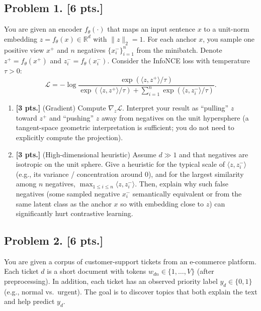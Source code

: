 \documentclass[11pt,a4paper]{article}
\begin{document}
\subsection{Problem 1. [6 pts.]}
You are given an encoder $f_{\theta}(\cdot)$ that maps an input sentence $x$ to a unit-norm embedding $z = f_{\theta}(x) \in \mathbb{R}^{d}$ with $\|z\|_{2} = 1$. For each anchor $x$, you sample one positive view $x^{+}$ and $n$ negatives $\{x_{i}^{-}\}_{i=1}^{n}$ from the minibatch. Denote $z^{+} = f_{\theta}(x^{+})$ and $z_{i}^{-} = f_{\theta}(x_{i}^{-})$. Consider the InfoNCE loss with temperature $\tau > 0$:
\[
\mathcal{L} = -\log \frac{\exp(\langle z, z^{+} \rangle / \tau)}{\exp(\langle z, z^{+} \rangle / \tau) + \sum_{i=1}^{n} \exp(\langle z, z_{i}^{-} \rangle / \tau)}.
\]
\begin{enumerate}[label=(\alph*)]
    \item \textbf{[3 pts.]} (Gradient) Compute $\nabla_z \mathcal{L}$. Interpret your result as ``pulling'' $z$ toward $z^{+}$ and ``pushing'' $z$ away from negatives on the unit hypersphere (a tangent-space geometric interpretation is sufficient; you do not need to explicitly compute the projection).
    \item \textbf{[3 pts.]} (High-dimensional heuristic) Assume $d \gg 1$ and that negatives are isotropic on the unit sphere. Give a heuristic for the typical scale of $\langle z, z_{i}^{-} \rangle$ (e.g., its variance / concentration around $0$), and for the largest similarity among $n$ negatives, $\max_{1 \le i \le n} \langle z, z_{i}^{-} \rangle$. Then, explain why such false negatives (some sampled negative $x_{i}^{-}$ semantically equivalent or from the same latent class as the anchor $x$ so with embedding close to $z$) can significantly hurt contrastive learning.
\end{enumerate}

\subsection{Problem 2. [6 pts.]}
You are given a corpus of customer-support tickets from an e-commerce platform. Each ticket $d$ is a short document with tokens $w_{dn} \in \{1, \dots, V\}$ (after preprocessing). In addition, each ticket has an observed priority label $y_d \in \{0, 1\}$ (e.g., normal vs.\ urgent). The goal is to discover topics that both explain the text and help predict $y_d$.
\end{document}

